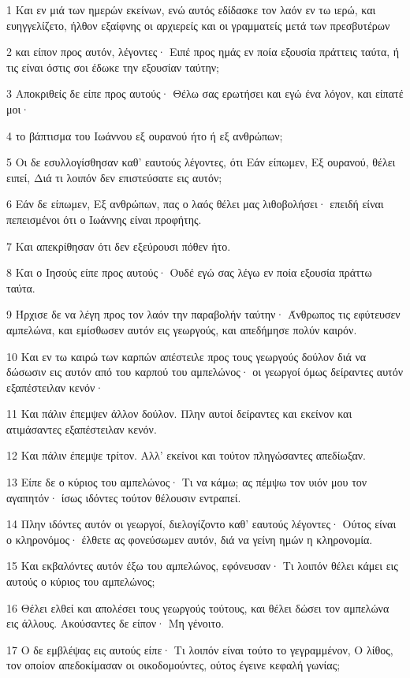 \par 1 Και εν μιά των ημερών εκείνων, ενώ αυτός εδίδασκε τον λαόν εν τω ιερώ, και ευηγγελίζετο, ήλθον εξαίφνης οι αρχιερείς και οι γραμματείς μετά των πρεσβυτέρων
\par 2 και είπον προς αυτόν, λέγοντες· Ειπέ προς ημάς εν ποία εξουσία πράττεις ταύτα, ή τις είναι όστις σοι έδωκε την εξουσίαν ταύτην;
\par 3 Αποκριθείς δε είπε προς αυτούς· Θέλω σας ερωτήσει και εγώ ένα λόγον, και είπατέ μοι·
\par 4 το βάπτισμα του Ιωάννου εξ ουρανού ήτο ή εξ ανθρώπων;
\par 5 Οι δε εσυλλογίσθησαν καθ' εαυτούς λέγοντες, ότι Εάν είπωμεν, Εξ ουρανού, θέλει ειπεί, Διά τι λοιπόν δεν επιστεύσατε εις αυτόν;
\par 6 Εάν δε είπωμεν, Εξ ανθρώπων, πας ο λαός θέλει μας λιθοβολήσει· επειδή είναι πεπεισμένοι ότι ο Ιωάννης είναι προφήτης.
\par 7 Και απεκρίθησαν ότι δεν εξεύρουσι πόθεν ήτο.
\par 8 Και ο Ιησούς είπε προς αυτούς· Ουδέ εγώ σας λέγω εν ποία εξουσία πράττω ταύτα.
\par 9 Ήρχισε δε να λέγη προς τον λαόν την παραβολήν ταύτην· Άνθρωπος τις εφύτευσεν αμπελώνα, και εμίσθωσεν αυτόν εις γεωργούς, και απεδήμησε πολύν καιρόν.
\par 10 Και εν τω καιρώ των καρπών απέστειλε προς τους γεωργούς δούλον διά να δώσωσιν εις αυτόν από του καρπού του αμπελώνος· οι γεωργοί όμως δείραντες αυτόν εξαπέστειλαν κενόν·
\par 11 Και πάλιν έπεμψεν άλλον δούλον. Πλην αυτοί δείραντες και εκείνον και ατιμάσαντες εξαπέστειλαν κενόν.
\par 12 Και πάλιν έπεμψε τρίτον. Αλλ' εκείνοι και τούτον πληγώσαντες απεδίωξαν.
\par 13 Είπε δε ο κύριος του αμπελώνος· Τι να κάμω; ας πέμψω τον υιόν μου τον αγαπητόν· ίσως ιδόντες τούτον θέλουσιν εντραπεί.
\par 14 Πλην ιδόντες αυτόν οι γεωργοί, διελογίζοντο καθ' εαυτούς λέγοντες· Ούτος είναι ο κληρονόμος· έλθετε ας φονεύσωμεν αυτόν, διά να γείνη ημών η κληρονομία.
\par 15 Και εκβαλόντες αυτόν έξω του αμπελώνος, εφόνευσαν· Τι λοιπόν θέλει κάμει εις αυτούς ο κύριος του αμπελώνος;
\par 16 Θέλει ελθεί και απολέσει τους γεωργούς τούτους, και θέλει δώσει τον αμπελώνα εις άλλους. Ακούσαντες δε είπον· Μη γένοιτο.
\par 17 Ο δε εμβλέψας εις αυτούς είπε· Τι λοιπόν είναι τούτο το γεγραμμένον, Ο λίθος, τον οποίον απεδοκίμασαν οι οικοδομούντες, ούτος έγεινε κεφαλή γωνίας;
